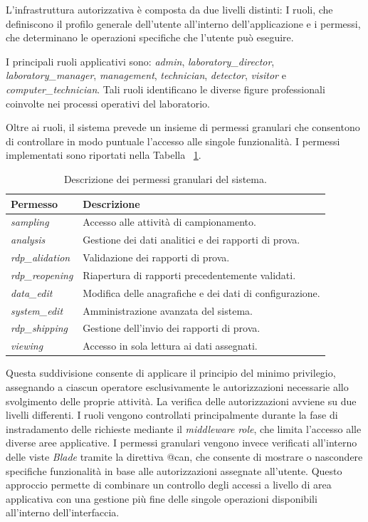 L'infrastruttura autorizzativa è composta da due livelli distinti: I ruoli, che definiscono il profilo generale dell'utente all'interno dell'applicazione e i permessi, che determinano le operazioni specifiche che l'utente può eseguire.

I principali ruoli applicativi sono: \textit{admin}, \textit{laboratory\_director}, \textit{laboratory\_manager}, \textit{management}, \textit{technician}, \textit{detector}, \textit{visitor} e \textit{computer\_technician}. Tali ruoli identificano le diverse figure professionali coinvolte nei processi operativi del laboratorio.

Oltre ai ruoli, il sistema prevede un insieme di permessi granulari che consentono di controllare in modo puntuale l'accesso alle singole funzionalità. I permessi implementati sono riportati nella Tabella ~\ref{tab:permessi_sistema}.
\begin{table}[t]
	\centering
	\begin{tabular}{ll}
		\hline
		\textbf{Permesso} & \textbf{Descrizione} \\ \hline
		\textit{sampling} & Accesso alle attività di campionamento. \\
		\textit{analysis} & Gestione dei dati analitici e dei rapporti di prova. \\
		\textit{rdp\_alidation} & Validazione dei rapporti di prova. \\
		\textit{rdp\_reopening} & Riapertura di rapporti precedentemente validati. \\
		\textit{data\_edit} & Modifica delle anagrafiche e dei dati di configurazione. \\
		\textit{system\_edit} & Amministrazione avanzata del sistema. \\
		\textit{rdp\_shipping} & Gestione dell'invio dei rapporti di prova. \\
		\textit{viewing} & Accesso in sola lettura ai dati assegnati. \\ \hline
	\end{tabular}
	\caption{Descrizione dei permessi granulari del sistema.}
	\label{tab:permessi_sistema}
\end{table}
Questa suddivisione consente di applicare il principio del minimo privilegio, assegnando a ciascun operatore esclusivamente le autorizzazioni necessarie allo svolgimento delle proprie attività. La verifica delle autorizzazioni avviene su due livelli differenti. I ruoli vengono controllati principalmente durante la fase di instradamento delle richieste mediante il \textit{middleware} \textit{role}, che limita l'accesso alle diverse aree applicative. I permessi granulari vengono invece verificati all'interno delle viste \textit{Blade} tramite la direttiva @can, che consente di mostrare o nascondere specifiche funzionalità in base alle autorizzazioni assegnate all'utente. Questo approccio permette di combinare un controllo degli accessi a livello di area applicativa con una gestione più fine delle singole operazioni disponibili all'interno dell'interfaccia.\\
